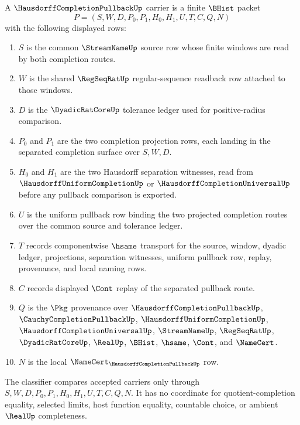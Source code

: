 \begin{definition}
\label{def:hausdorff-completion-pullback-carrier}
A $\HausdorffCompletionPullbackUp$ carrier is a finite $\BHist$ packet
$$
P=(S,W,D,P_0,P_1,H_0,H_1,U,T,C,Q,N)
$$
with the following displayed rows:
\begin{enumerate}
\item $S$ is the common $\StreamNameUp$ source row whose finite windows are read by both completion routes.
\item $W$ is the shared $\RegSeqRatUp$ regular-sequence readback row attached to those windows.
\item $D$ is the $\DyadicRatCoreUp$ tolerance ledger used for positive-radius comparison.
\item $P_0$ and $P_1$ are the two completion projection rows, each landing in the separated completion surface over $S,W,D$.
\item $H_0$ and $H_1$ are the two Hausdorff separation witnesses, read from $\HausdorffUniformCompletionUp$ or $\HausdorffCompletionUniversalUp$ before any pullback comparison is exported.
\item $U$ is the uniform pullback row binding the two projected completion routes over the common source and tolerance ledger.
\item $T$ records componentwise $\hsame$ transport for the source, window, dyadic ledger, projections, separation witnesses, uniform pullback row, replay, provenance, and local naming rows.
\item $C$ records displayed $\Cont$ replay of the separated pullback route.
\item $Q$ is the $\Pkg$ provenance over $\HausdorffCompletionPullbackUp$, $\CauchyCompletionPullbackUp$, $\HausdorffUniformCompletionUp$, $\HausdorffCompletionUniversalUp$, $\StreamNameUp$, $\RegSeqRatUp$, $\DyadicRatCoreUp$, $\RealUp$, $\BHist$, $\hsame$, $\Cont$, and $\NameCert$.
\item $N$ is the local $\NameCert_{\HausdorffCompletionPullbackUp}$ row.
\end{enumerate}
The classifier compares accepted carriers only through $S,W,D,P_0,P_1,H_0,H_1,U,T,C,Q,N$. It has no coordinate for quotient-completion equality, selected limits, host function equality, countable choice, or ambient $\RealUp$ completeness.
\end{definition}

